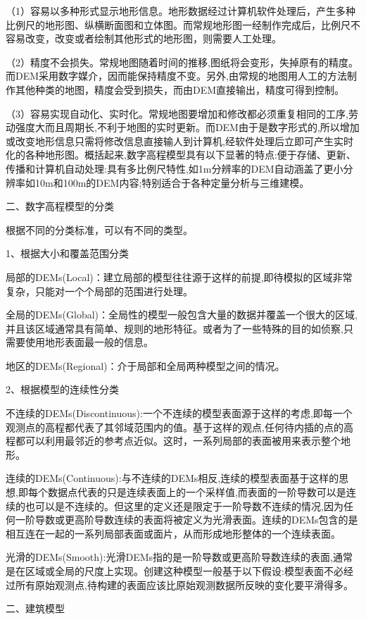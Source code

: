 （1）容易以多种形式显示地形信息。地形数据经过计算机软件处理后，产生多种比例尺的地形图、纵横断面图和立体图。而常规地形图一经制作完成后，比例尺不容易改变，改变或者绘制其他形式的地形图，则需要人工处理。

（2）精度不会损失。常规地图随着时间的推移,图纸将会变形，失掉原有的精度。而DEM采用数字媒介，因而能保持精度不变。另外,由常规的地图用人工的方法制作其他种类的地图，精度会受到损失，而由DEM直接输出，精度可得到控制。

（3）容易实现自动化、实时化。常规地图要增加和修改都必须重复相同的工序,劳动强度大而且周期长,不利于地图的实时更新。而DEM由于是数字形式的,所以增加或改变地形信息只需将修改信息直接输人到计算机,经软件处理后立即可产生实时化的各种地形图。概括起来,数字高程模型具有以下显著的特点:便于存储、更新、传播和计算机自动处理:具有多比例尺特性,如1m分辨率的DEM自动涵盖了更小分辨率如10m和100m的DEM内容;特别适合于各种定量分析与三维建模。

二、数字高程模型的分类

根据不同的分类标准，可以有不同的类型。

1、根据大小和覆盖范围分类

局部的DEMs(Local)：建立局部的模型往往源于这样的前提,即待模拟的区域非常复杂，只能对一个个局部的范围进行处理。

全局的DEMs(Global)：全局性的模型一般包含大量的数据并覆盖一个很大的区域,并且该区域通常具有简单、规则的地形特征。或者为了一些特殊的目的如侦察,只需要使用地形表面最一般的信息。

地区的DEMs(Regional)：介于局部和全局两种模型之间的情况。

2、根据模型的连续性分类

不连续的DEMs(Discontinuous):一个不连续的模型表面源于这样的考虑,即每一个观测点的高程都代表了其邻域范围内的值。基于这样的观点,任何待内插的点的高程都可以利用最邻近的参考点近似。这时，一系列局部的表面被用来表示整个地形。

连续的DEMs(Continuous):与不连续的DEMs相反,连续的模型表面基于这样的思想,即每个数据点代表的只是连续表面上的一个采样值,而表面的一阶导数可以是连续的也可以是不连续的。但这里的定义还是限定于一阶导数不连续的情况,因为任何一阶导数或更高阶导数连续的表面将被定义为光滑表面。连续的DEMs包含的是相互连在一起的一系列局部表面或面片，从而形成地形整体的一个连续表面。

光滑的DEMs(Smooth):光滑DEMs指的是一阶导数或更高阶导数连续的表面,通常是在区域或全局的尺度上实现。创建这种模型一般基于以下假设:模型表面不必经过所有原始观测点,待构建的表面应该比原始观测数据所反映的变化要平滑得多。

二、建筑模型

